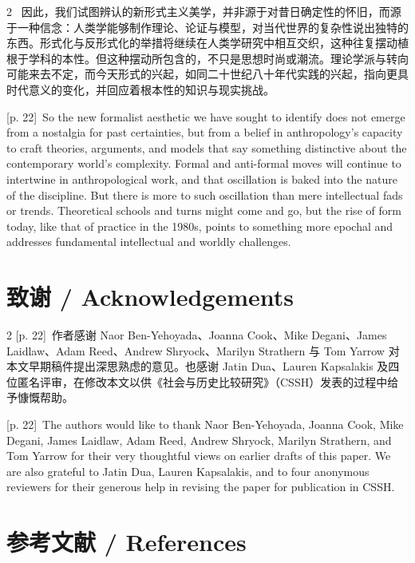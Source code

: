\documentclass[10pt,a4paper]{article}
\begin{document}
\begin{paracol}{2}
\switchcolumn*
{\scriptsize\color{gray} [p. 22]}\ 因此，我们试图辨认的新形式主义美学，并非源于对昔日确定性的怀旧，而源于一种信念：人类学能够制作理论、论证与模型，对当代世界的复杂性说出独特的东西。形式化与反形式化的举措将继续在人类学研究中相互交织，这种往复摆动植根于学科的本性。但这种摆动所包含的，不只是思想时尚或潮流。理论学派与转向可能来去不定，而今天形式的兴起，如同二十世纪八十年代实践的兴起，指向更具时代意义的变化，并回应着根本性的知识与现实挑战。\par
\switchcolumn
{\scriptsize\color{gray} [p. 22]}\ So the new formalist aesthetic we have sought to identify does not emerge from a nostalgia for past certainties, but from a belief in anthropology’s capacity to craft theories, arguments, and models that say something distinctive about the contemporary world’s complexity. Formal and anti-formal moves will continue to intertwine in anthropological work, and that oscillation is baked into the nature of the discipline. But there is more to such oscillation than mere intellectual fads or trends. Theoretical schools and turns might come and go, but the rise of form today, like that of practice in the 1980s, points to something more epochal and addresses fundamental intellectual and worldly challenges.\par
\switchcolumn*
\end{paracol}
\section*{致谢 / Acknowledgements}
\begin{paracol}{2}
{\scriptsize\color{gray} [p. 22]}\ 作者感谢 Naor Ben-Yehoyada、Joanna Cook、Mike Degani、James Laidlaw、Adam Reed、Andrew Shryock、Marilyn Strathern 与 Tom Yarrow 对本文早期稿件提出深思熟虑的意见。也感谢 Jatin Dua、Lauren Kapsalakis 及四位匿名评审，在修改本文以供《社会与历史比较研究》（CSSH）发表的过程中给予慷慨帮助。\par
\switchcolumn
{\scriptsize\color{gray} [p. 22]}\ The authors would like to thank Naor Ben-Yehoyada, Joanna Cook, Mike Degani, James Laidlaw, Adam Reed, Andrew Shryock, Marilyn Strathern, and Tom Yarrow for their very thoughtful views on earlier drafts of this paper. We are also grateful to Jatin Dua, Lauren Kapsalakis, and to four anonymous reviewers for their generous help in revising the paper for publication in CSSH.\par
\switchcolumn*
\end{paracol}
\section*{参考文献 / References}
\end{document}
